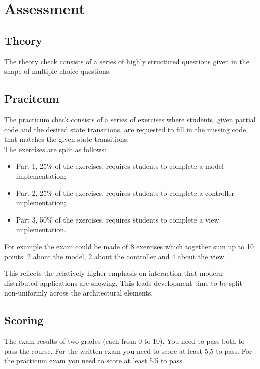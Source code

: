 \section{Assessment}

\subsection*{Theory}
The theory check consists of a series of highly structured questions given in the shape of multiple choice questions.
 
\subsection*{Pracitcum}
The practicum check consists of a series of exercises where students, given partial
code and the desired state transitions, are requested to fill in the
missing code that matches the given state transitions.
\\
The exercises are split as follows: 
\begin{itemize}
\item Part 1, 25\% of the exercises, requires students to complete a model implementation; 
\item Part 2, 25\% of the exercises, requires students to complete a controller implementation; 
\item Part 3, 50\% of the exercises, requires students to complete a view implementation.
\end{itemize}

For example the exam could be made of 8 exercises which together sum up to 10 points: 2 about the model, 2
about the controller and 4 about the view.

This reflects the relatively higher emphasis on interaction that modern
distributed applications are showing. This leads development time to be
split non-uniformly across the architectural elements.

\subsection*{Scoring}

The exam results of two grades (each from 0 to 10). You need to pass both to pass the course.
For the written exam you need to score at least 5,5 to pass. 
For the practicum exam you need to score at least 5,5 to pass.  



